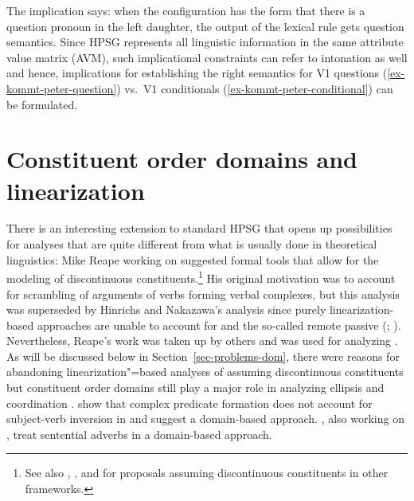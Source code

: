 \documentclass[output=paper]{langsci/langscibook}
\begin{document}
The implication says: when the configuration has the form that there is a question pronoun in the
left daughter, the output of the lexical rule gets question semantics. Since HPSG represents all
linguistic information in the same attribute value matrix (AVM), such implicational constraints can refer to intonation as
well and hence, implications for establishing the right semantics for V1 questions (\ref{ex-kommt-peter-question}) vs.\ V1
conditionals (\ref{ex-kommt-peter-conditional}) can be formulated.



\section{Constituent order domains and linearization}
\label{sec-domains}

There is an interesting extension to standard HPSG that opens up possibilities for analyses that are
quite different from what is usually done in theoretical linguistics: Mike Reape
\citeyearpar{Reape91,Reape92a,Reape94a} working on  suggested formal tools that allow for the
modeling of discontinuous constituents.\footnote{
  See also , , and  for proposals assuming discontinuous constituents in other frameworks.%
} His original motivation was to account for scrambling of arguments of verbs forming
verbal complexes, but this analysis was superseded by Hinrichs and Nakazawa's analysis
\citep{HN89a,HN94a} since purely linearization-based approaches are unable to account for 
and the so-called remote passive (\citealp[Section~5.1, Section~5.2]{Kathol98b};
\citealp[Chapter~21.1]{Mueller99a}). Nevertheless, Reape's work was taken up by others and was used for analyzing 
\citep{KP95a,Kathol2000a,Mueller95c,Babel,Mueller2004b,Wetta2011a,Wetta2014a-u}. As will be
discussed below in Section~\ref{sec-problems-dom}, there were reasons for abandoning linearization"=based analyses of  assuming discontinuous constituents \citep{Mueller2005d,MuellerGS} but constituent order
domains still play a major role in analyzing ellipsis  and
coordination .  \citet*{BGM99a} show that complex
predicate formation does not account for subject-verb inversion in  and suggest a
domain-based approach. \citet{BG2007b-u}, also working on , treat sentential adverbs in
a domain-based approach.
\end{document}
